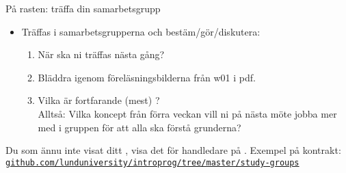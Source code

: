 \begin{Slide}{På rasten: träffa din samarbetsgrupp}
\begin{itemize}
\item Träffas i samarbetsgrupperna och bestäm/gör/diskutera:
\begin{enumerate}
\item När ska ni träffas nästa gång?
\item Bläddra igenom föreläsningsbilderna från w01 i pdf.
\item Vilka  är fortfarande (mest) ? \\Alltså: Vilka koncept från förra veckan vill ni på nästa möte jobba mer med i gruppen för att alla ska förstå grunderna?
\end{enumerate}
\end{itemize}
\vspace{1em}Du som ännu inte visat ditt , visa det för handledare på . Exempel på kontrakt:
\\\href{https://github.com/lunduniversity/introprog/tree/master/study-groups}{\footnotesize\texttt{github.com/lunduniversity/introprog/tree/master/study-groups}}
\end{Slide}


